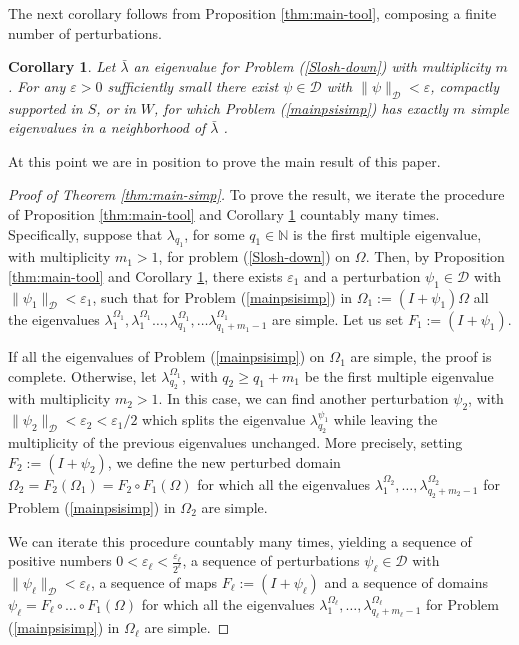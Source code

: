 \documentclass[a4paper,reqno,11pt,oneside]{amsart}
\theoremstyle{plain}
\theoremstyle{plain}
\theoremstyle{plain}
\newtheorem{cor}[thm]{Corollary}
\theoremstyle{remark}
\begin{document}
The next corollary follows from Proposition \ref{thm:main-tool}, composing
a finite number of perturbations.
\begin{cor}\label{cor:auto-semplice-0}
Let $\bar\lambda$ an eigenvalue for Problem (\ref{Slosh-down}) with multiplicity $m$.  For any $\varepsilon>0$ sufficiently small there exist $\psi \in \mathcal{D}$  with $\|\psi\|_\mathcal{D}<\varepsilon$, compactly supported in $S$, or in $W$,  for which  Problem (\ref{mainpsisimp})  has exactly $m$ simple eigenvalues in a neighborhood of $\bar\lambda$ .

\end{cor}
At this point we are in position to prove the main result of this paper.
\begin{proof}[Proof of Theorem  \ref{thm:main-simp}]
To prove the result, we iterate the procedure of Proposition \ref{thm:main-tool} and Corollary \ref{cor:auto-semplice-0} countably many times.  
Specifically, suppose that  $ \lambda_{q_1}$, for some $q_1\in \mathbb{N}$ is the first multiple eigenvalue, with multiplicity $m_1>1$, for problem (\ref{Slosh-down}) on $\Omega$. Then, by Proposition  \ref{thm:main-tool} and Corollary  \ref{cor:auto-semplice-0}, there exists $\varepsilon_1$ and a perturbation $\psi_1\in\mathcal{D}$ with  $\|\psi_1\|_\mathcal{D}<\varepsilon_1$, such that for Problem (\ref{mainpsisimp}) in $\Omega_{1}:=(I+\psi_1)\Omega$ all the eigenvalues $\lambda^{\Omega_1}_1, \lambda^{\Omega_1}_1\dots,\lambda^{\Omega_1}_{q_1},\dots \lambda^{\Omega_1}_{{q_1}+m_1-1}$ are simple. Let us set $F_1:=(I+\psi_1)$. 

If all the eigenvalues of Problem (\ref{mainpsisimp}) on $\Omega_1$ are simple, the proof is complete. Otherwise, let $ \lambda^{\Omega_1}_{q_2}$, with $q_2\ge q_1+m_1$ be the first multiple eigenvalue with multiplicity $m_2>1$.  In this case, we can find another perturbation $\psi_2$, with $\|\psi_2\|_\mathcal{D}<\varepsilon_2< \varepsilon_1/2$ which splits the eigenvalue  $ \lambda^{\psi_1}_{q_2}$ while leaving the multiplicity of the previous eigenvalues unchanged. More precisely, setting $F_2:=(I+\psi_2)$, we define the new perturbed domain $\Omega_2=F_2(\Omega_1)=F_2\circ F_1 (\Omega)$ for which all the eigenvalues $\lambda^{\Omega_2}_1,\dots, \lambda^{\Omega_2}_{{q_2}+m_2-1}$  for Problem (\ref{mainpsisimp}) in $\Omega_2$ are simple. 

We can iterate this procedure countably many times, yielding a sequence of positive numbers $0<\varepsilon_\ell<    \frac{\varepsilon_\ell}{2^\ell}$, a sequence of perturbations $\psi_\ell\in \mathcal{D}$ with $\|\psi_\ell\|_\mathcal{D}<\varepsilon_\ell$, a sequence of maps $F_\ell:=(I+\psi_\ell)$ and a sequence of domains $\psi_\ell=F_\ell\circ\dots\circ F_1(\Omega)$ for  which all the eigenvalues $\lambda_1^{\Omega_\ell},\dots,\lambda^{\Omega_\ell}_{q_\ell+m_\ell-1}$  for Problem (\ref{mainpsisimp}) in $\Omega_\ell$ are simple. 


\end{proof}
\end{document}
